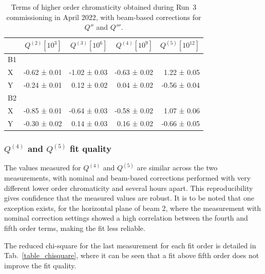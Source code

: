 \begin{table}[tbh]
    \centering
    \small
    \setlength{\tabcolsep}{4.2pt}
    \begin{tabular}{|l||r|r|r|r|}
    \hline
                 & $Q^{(2)} [10^3]$ & $Q^{(3)} [10^6]$ & $Q^{(4)} [10^9]$ & $Q^{(5)} [10^{12}]$ \\ \hline\hline
        B1    &           &          &              &              \\
        X         & -0.62 ± 0.01     & -1.02 ± 0.03 & -0.63 ± 0.02 &  1.22 ± 0.05 \\
        Y         & -0.24 ± 0.01     & 0.12 ± 0.02 &  0.04 ± 0.02 & -0.56 ± 0.04 \\ \hline
        B2    &           &          &              &              \\
        X         & -0.85 ± 0.01     & -0.64 ± 0.03 & -0.58 ± 0.02 &  1.07 ± 0.06 \\
        Y         & -0.30 ± 0.02     & 0.14 ± 0.03 &  0.16 ± 0.02 & -0.66 ± 0.05 \\ \hline
    \end{tabular}
    \caption{Terms of higher order chromaticity obtained during Run~3 commissioning in April 2022, with beam-based corrections for $Q''$ and $Q'''$.}
    \label{chroma_table_after}
\end{table}


\subsubsection{\texorpdfstring{$Q^{(4)}$ and $Q^{(5)}$}{Q4 and Q5} fit quality}
\label{subsection:q4q5_quality}

The values measured for $Q^{(4)}$ and $Q^{(5)}$ are similar across the two measurements, with nominal and beam-based corrections performed with very different lower order chromaticity and several hours apart.
This reproducibility gives confidence that the measured values are robust.
It is to be noted that one exception exists, for the horizontal plane of beam 2, where the measurement with nominal correction settings showed a high correlation between the fourth and fifth order terms, making the fit less reliable.

The reduced chi-square for the last measurement for each fit order is detailed in Tab.~\ref{table_chisquare}, where it can be seen that a fit above fifth order does not improve the fit quality.

